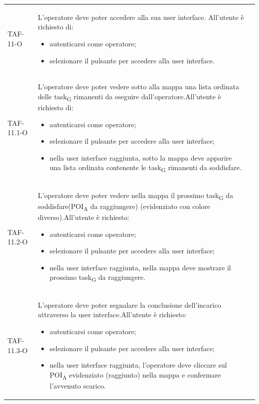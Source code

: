 \begin{longtable}{ >{\centering}p{} >{}p{}
		>{\centering}p{}}
	TAF-11-O & L'operatore deve poter accedere alla sua user interface. All'utente è richiesto di: \begin{itemize} \item autenticarsi come operatore; \item selezionare il pulsante per accedere alla user interface.\end{itemize} & 0\tabularnewline

	TAF-11.1-O & L'operatore deve poter vedere sotto alla mappa una lista ordinata delle \gls{task}\textsubscript{G} rimanenti da eseguire dall'operatore.\newline All'utente è richiesto di: \begin{itemize} \item autenticarsi come operatore; \item selezionare il pulsante per accedere alla user interface; \item nella user interface raggiunta, sotto la mappa deve apparire una lista ordinata contenente le \gls{task}\textsubscript{G} rimanenti da soddisfare.\end{itemize} & 0\tabularnewline

	TAF-11.2-O & L'operatore deve poter vedere nella mappa il prossimo \gls{task}\textsubscript{G} da soddisfare(\acrshort{POI}\textsubscript{A} da raggiungere) (evidenziato con colore diverso).\newline All'utente è richiesto: \begin{itemize} \item autenticarsi come operatore; \item selezionare il pulsante per accedere alla user interface; \item nella user interface raggiunta, nella mappa deve mostrare il prossimo \gls{task}\textsubscript{G} da raggiungere.\end{itemize} & 0\tabularnewline

	TAF-11.3-O & L'operatore deve poter segnalare la conclusione dell'incarico attraverso la user interface.\newline All'utente è richiesto: \begin{itemize} \item autenticarsi come operatore; \item selezionare il pulsante per accedere alla user interface; \item nella user interface raggiunta, l'operatore deve cliccare sul \acrshort{POI}\textsubscript{A} evidenziato (raggiunto) nella mappa e confermare l'avvenuto scarico.\end{itemize} & 0\tabularnewline


\end{longtable}
